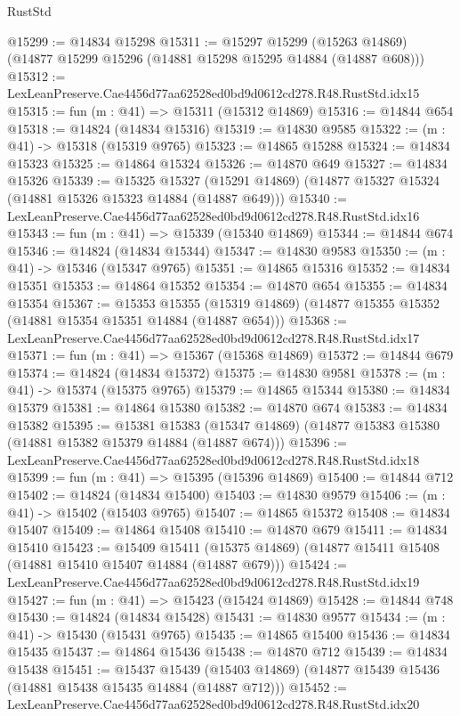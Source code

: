 \begin{lexlean}{RustStd}
\begin{coremodule}
@15299 := @14834 @15298
@15311 := @15297
    @15299
    (@15263 @14869)
    (@14877 @15299 @15296 (@14881 @15298 @15295 @14884 (@14887 @608)))
@15312 := LexLeanPreserve.Cae4456d77aa62528ed0bd9d0612cd278.R48.RustStd.idx15
@15315 := fun (m : @41) => @15311 (@15312 @14869)
@15316 := @14844 @654
@15318 := @14824 (@14834 @15316)
@15319 := @14830 @9585
@15322 := (m : @41) -> @15318 (@15319 @9765)
@15323 := @14865 @15288
@15324 := @14834 @15323
@15325 := @14864 @15324
@15326 := @14870 @649
@15327 := @14834 @15326
@15339 := @15325
    @15327
    (@15291 @14869)
    (@14877 @15327 @15324 (@14881 @15326 @15323 @14884 (@14887 @649)))
@15340 := LexLeanPreserve.Cae4456d77aa62528ed0bd9d0612cd278.R48.RustStd.idx16
@15343 := fun (m : @41) => @15339 (@15340 @14869)
@15344 := @14844 @674
@15346 := @14824 (@14834 @15344)
@15347 := @14830 @9583
@15350 := (m : @41) -> @15346 (@15347 @9765)
@15351 := @14865 @15316
@15352 := @14834 @15351
@15353 := @14864 @15352
@15354 := @14870 @654
@15355 := @14834 @15354
@15367 := @15353
    @15355
    (@15319 @14869)
    (@14877 @15355 @15352 (@14881 @15354 @15351 @14884 (@14887 @654)))
@15368 := LexLeanPreserve.Cae4456d77aa62528ed0bd9d0612cd278.R48.RustStd.idx17
@15371 := fun (m : @41) => @15367 (@15368 @14869)
@15372 := @14844 @679
@15374 := @14824 (@14834 @15372)
@15375 := @14830 @9581
@15378 := (m : @41) -> @15374 (@15375 @9765)
@15379 := @14865 @15344
@15380 := @14834 @15379
@15381 := @14864 @15380
@15382 := @14870 @674
@15383 := @14834 @15382
@15395 := @15381
    @15383
    (@15347 @14869)
    (@14877 @15383 @15380 (@14881 @15382 @15379 @14884 (@14887 @674)))
@15396 := LexLeanPreserve.Cae4456d77aa62528ed0bd9d0612cd278.R48.RustStd.idx18
@15399 := fun (m : @41) => @15395 (@15396 @14869)
@15400 := @14844 @712
@15402 := @14824 (@14834 @15400)
@15403 := @14830 @9579
@15406 := (m : @41) -> @15402 (@15403 @9765)
@15407 := @14865 @15372
@15408 := @14834 @15407
@15409 := @14864 @15408
@15410 := @14870 @679
@15411 := @14834 @15410
@15423 := @15409
    @15411
    (@15375 @14869)
    (@14877 @15411 @15408 (@14881 @15410 @15407 @14884 (@14887 @679)))
@15424 := LexLeanPreserve.Cae4456d77aa62528ed0bd9d0612cd278.R48.RustStd.idx19
@15427 := fun (m : @41) => @15423 (@15424 @14869)
@15428 := @14844 @748
@15430 := @14824 (@14834 @15428)
@15431 := @14830 @9577
@15434 := (m : @41) -> @15430 (@15431 @9765)
@15435 := @14865 @15400
@15436 := @14834 @15435
@15437 := @14864 @15436
@15438 := @14870 @712
@15439 := @14834 @15438
@15451 := @15437
    @15439
    (@15403 @14869)
    (@14877 @15439 @15436 (@14881 @15438 @15435 @14884 (@14887 @712)))
@15452 := LexLeanPreserve.Cae4456d77aa62528ed0bd9d0612cd278.R48.RustStd.idx20

\end{coremodule}
\end{lexlean}
